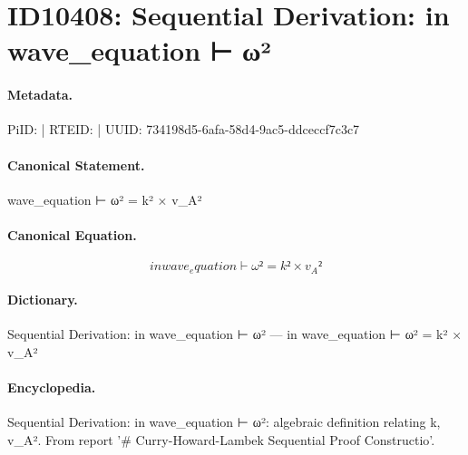 \section*{ID10408: Sequential Derivation: in wave\_equation ⊢ ω²}
\paragraph{Metadata.}
PiID:  | RTEID:  | UUID: 734198d5-6afa-58d4-9ac5-ddceccf7c3c7

\paragraph{Canonical Statement.}
wave\_equation ⊢ ω² = k² × v\_A²

\paragraph{Canonical Equation.}
\[
in wave_equation ⊢ ω² = k² × v_A²
\]

\paragraph{Dictionary.}
Sequential Derivation: in wave\_equation ⊢ ω² — in wave\_equation ⊢ ω² = k² × v\_A²

\paragraph{Encyclopedia.}
Sequential Derivation: in wave\_equation ⊢ ω²: algebraic definition relating k, v\_A². From report '\# Curry-Howard-Lambek Sequential Proof Constructio'.
